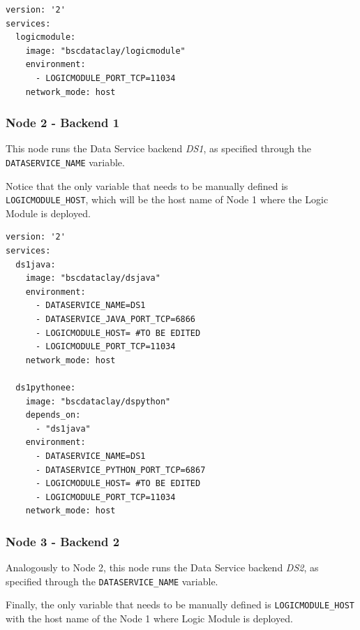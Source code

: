 \begin{tBox}
 \begin{lstlisting}[language=docker-compose-2, frame=none]
version: '2'
services:
  logicmodule:
    image: "bscdataclay/logicmodule"
    environment:
      - LOGICMODULE_PORT_TCP=11034
    network_mode: host
 \end{lstlisting}
\end{tBox}

\subsubsection{Node 2 - Backend 1}

This node runs the Data Service backend \textit{DS1}, as specified through the \texttt{DATASERVICE\_NAME} variable.

Notice that the only variable that needs to be manually defined is \texttt{LOGICMODULE\_HOST}, which will be the host name of Node 1 where the Logic Module is deployed.

\begin{tBox}
 \begin{lstlisting}[language=docker-compose-2, frame=none]
version: '2'
services:
  ds1java:
    image: "bscdataclay/dsjava"
    environment:
      - DATASERVICE_NAME=DS1
      - DATASERVICE_JAVA_PORT_TCP=6866
      - LOGICMODULE_HOST= #TO BE EDITED
      - LOGICMODULE_PORT_TCP=11034
    network_mode: host

  ds1pythonee:
    image: "bscdataclay/dspython"
    depends_on:
      - "ds1java"
    environment:
      - DATASERVICE_NAME=DS1
      - DATASERVICE_PYTHON_PORT_TCP=6867
      - LOGICMODULE_HOST= #TO BE EDITED
      - LOGICMODULE_PORT_TCP=11034
    network_mode: host
 \end{lstlisting}
\end{tBox}

\subsubsection{Node 3 - Backend 2}

Analogously to Node 2, this node runs the Data Service backend \textit{DS2}, as specified through the \texttt{DATASERVICE\_NAME} variable.

Finally, the only variable that needs to be manually defined is \texttt{LOGICMODULE\_HOST} with the host name of the Node 1 where Logic Module is deployed.

